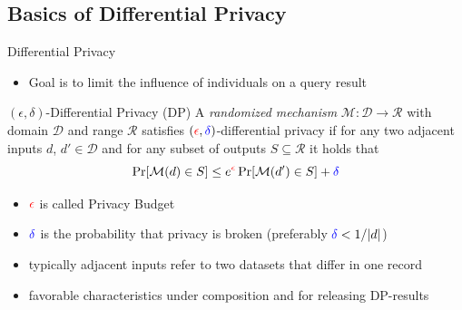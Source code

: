 \documentclass[aspectratio=169]{beamer}
\begin{document}
\subsection{Basics of Differential Privacy}

\begin{frame}{Differential Privacy}
    \begin{itemize}
        \item Goal is to limit the influence of individuals on a query result
    \end{itemize}
\end{frame}

\begin{frame}
    \begin{block}{$(\epsilon, \delta)$-Differential Privacy (DP)}
        A \textit{randomized mechanism} $\mathcal{M}: \mathcal{D} \rightarrow \mathcal{R}$ with domain $\mathcal{D}$ and range $\mathcal{R}$ satisfies $(\textcolor{red}{\epsilon}, \textcolor{blue}{\delta})$-differential privacy if for any two adjacent inputs $d$, $d' \in \mathcal{D}$ and for any subset of outputs $S \subseteq \mathcal{R}$ it holds that $$\Pr[\mathcal{M}(d) \in S] \leq e^{\textcolor{red}{\epsilon}} \Pr[\mathcal{M}(d') \in S] + \textcolor{blue}{\delta}$$
    \end{block}
    \begin{itemize}
        \item<2-> $\textcolor{red}{\epsilon}$ is called Privacy Budget
        \item<2-> $\textcolor{blue}{\delta}$ is the probability that privacy is broken (preferably $\textcolor{blue}{\delta} < 1 / |d|$)
        \item<3-> typically adjacent inputs refer to two datasets that differ in one record
        \item<3-> favorable characteristics under composition and for releasing DP-results
    \end{itemize}
\end{frame}
\end{document}
